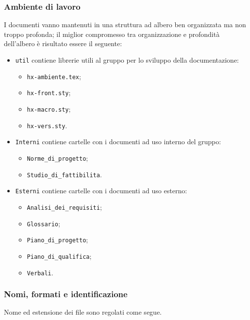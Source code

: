 \subsubsection{Ambiente di lavoro} I documenti vanno mantenuti in una struttura ad albero ben organizzata ma non troppo profonda; il miglior compromesso tra organizzazione e profondità dell'albero è risultato essere il seguente:
\begin{itemize}
	\item \texttt{util} contiene librerie utili al gruppo per lo sviluppo della documentazione:
	\begin{itemize}
		\item \texttt{hx-ambiente.tex};
		\item \texttt{hx-front.sty};
		\item \texttt{hx-macro.sty};
		\item \texttt{hx-vers.sty}.
	\end{itemize}
	\item \texttt{Interni} contiene cartelle con i documenti ad uso interno del gruppo:
	\begin{itemize}
		\item \texttt{Norme_di_progetto};
		\item \texttt{Studio_di_fattibilita}.
	\end{itemize}
	\item \texttt{Esterni} contiene cartelle con i documenti ad uso esterno:
	\begin{itemize}
		\item \texttt{Analisi_dei_requisiti};
		\item \texttt{Glossario};
		\item \texttt{Piano_di_progetto};
		\item \texttt{Piano_di_qualifica};
		\item \texttt{Verbali}.
	\end{itemize}
\end{itemize}

\subsubsection{Nomi, formati e identificazione} Nome ed estensione dei file sono regolati come segue.
